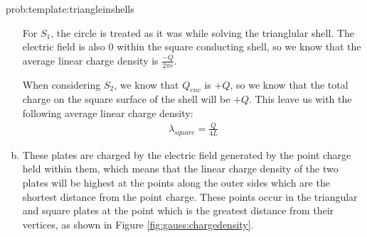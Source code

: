 \begin{solution}{prob:template:triangleinshells}
\begin{enumerate}[(a)]
		
	For $S_1$, the circle is treated as it was while solving the trianglular shell. The electric field is also $0$ within the square conducting shell, so we know that the average linear charge density is $\frac{-Q}{2\pi r}$.
	
	When considering $S_2$, we know that $Q_{enc}$ is $+Q$, so we know that the total charge on the square surface of the shell will be $+Q$. This leave us with the following average linear charge density:
	\begin{align*}
		\lambda_{square} = \frac{Q}{4L}
	\end{align*}	
	
	\item These plates are charged by the electric field generated by the point charge held within them, which means that the linear charge density of the two plates will be highest at the points along the outer sides which are the shortest distance from the point charge. These points occur in the triangular and square plates at the point which is the greatest distance from their vertices, as shown in Figure \ref{fig:gauss:chargedensity}.
	
	
	\end{enumerate}
\end{solution}
